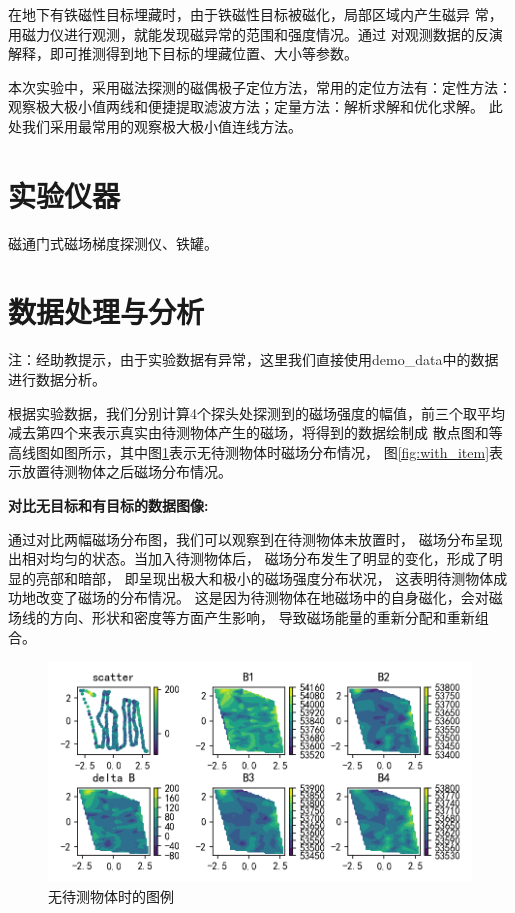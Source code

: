 \documentclass[UTF8]{ctexart}
\begin{document}
在地下有铁磁性目标埋藏时，由于铁磁性目标被磁化，局部区域内产生磁异
常，用磁力仪进行观测，就能发现磁异常的范围和强度情况。通过
对观测数据的反演解释，即可推测得到地下目标的埋藏位置、大小等参数。
    
本次实验中，采用磁法探测的磁偶极子定位方法，常用的定位方法有：定性方法：观察极大极小值两线和便捷提取滤波方法；定量方法：解析求解和优化求解。
此处我们采用最常用的观察极大极小值连线方法。

\section{实验仪器}

磁通门式磁场梯度探测仪、铁罐。

\section{数据处理与分析}

注：经助教提示，由于实验数据有异常，这里我们直接使用demo\_data中的数据进行数据分析。

根据实验数据，我们分别计算4个探头处探测到的磁场强度的幅值，前三个取平均减去第四个来表示真实由待测物体产生的磁场，将得到的数据绘制成
散点图和等高线图如图所示，其中图\ref{fig:no_item}表示无待测物体时磁场分布情况，
图\ref{fig:with_item}表示放置待测物体之后磁场分布情况。

\noindent \textbf{对比无目标和有目标的数据图像:}

通过对比两幅磁场分布图，我们可以观察到在待测物体未放置时，
磁场分布呈现出相对均匀的状态。当加入待测物体后，
磁场分布发生了明显的变化，形成了明显的亮部和暗部，
即呈现出极大和极小的磁场强度分布状况，
这表明待测物体成功地改变了磁场的分布情况。
这是因为待测物体在地磁场中的自身磁化，会对磁场线的方向、形状和密度等方面产生影响，
导致磁场能量的重新分配和重新组合。


\begin{figure}[h]
    \centering
    \includegraphics[scale=0.7]{no_item.png}
    \caption{无待测物体时的图例}
    \label{fig:no_item}
\end{figure}
\end{document}
